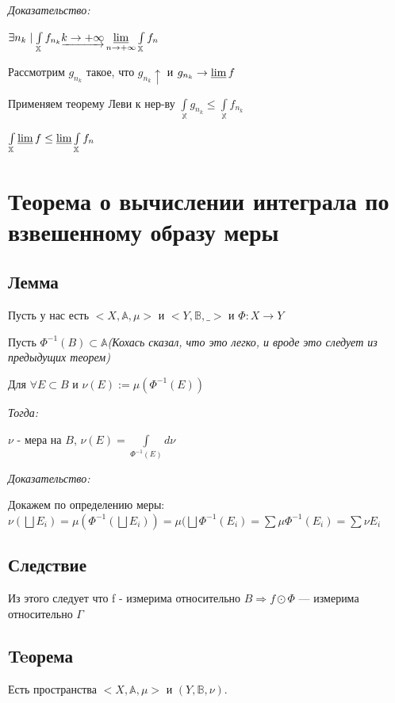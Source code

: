 \documentclass[paper=a4, fontsize=17pt]{article}
\begin{document}
\emph{Доказательство:}

$ \exists n_k \mid \int\limits_{\mathbb{X}} f_{n_k} \underrightarrow{k \rightarrow +\infty}
\varliminf\limits_{n \rightarrow +\infty} \int\limits_{\mathbb{X}} f_n $

Рассмотрим $ g_{n_k} $ такое, что $ g_{n_k} \uparrow $ и $ g_{n_k} \rightarrow \varliminf f $

Применяем теорему Леви к нер-ву $ \int\limits_{\mathbb{X}} g_{n_k} \leq \int\limits_{\mathbb{X}} f_{n_k}$

$ \int\limits_{\mathbb{X}} \varliminf f \leq \varliminf \int\limits_{\mathbb{X}} f_n $

\section{Теорема о вычислении интеграла по взвешенному образу меры}
	\subsection{Лемма}
		Пусть у нас есть $<X, \mathbb{A}, \mu>$ и $<Y, \mathbb{B}, \_>$ и $\Phi: X\rightarrow Y$
		
		Пусть  $\Phi^{-1}(B) \subset \mathbb{A}$\textit{(Кохась сказал, что это легко, и вроде это следует из предыдущих теорем)}
		
		Для $\forall E \subset B$ и $\nu(E):=\mu(\Phi^{-1}(E))$
		
		\emph{Тогда:}
		
		 $\nu$ - мера на $B$, $\nu(E) = \int\limits_{\Phi^{-1}(E)}d\nu$
		
		\emph{Доказательство:}
		
			Докажем по определению меры: \\
		
			$\nu(\bigsqcup E_i) = \mu(\Phi^{-1}(\bigsqcup E_i)) = \mu(\bigsqcup \Phi^{-1}(E_i) = \sum \mu \Phi^{-1}(E_i) = \sum \nu E_i$
	
	\subsection{Следствие}
	Из этого следует что f - измерима относительно $B \Rightarrow f\odot \Phi $ --- измерима относительно $\Gamma$
	
	\subsection {Teорема}
		Есть пространства $<X, \mathbb{A}, \mu>$ и $(Y, \mathbb{B}, \nu)$.
		
\end{document}

